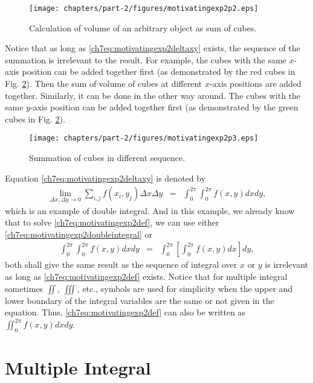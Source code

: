 \begin{figure}
	\centering
	\texttt{[image: chapters/part-2/figures/motivatingexp2p2.eps]}
	\caption{Calculation of volume of an arbitrary object as sum of cubes.} \label{ch7fig:motivatingexp2p2}
\end{figure}

Notice that as long as \eqref{ch7eq:motivatingexp2deltaxy} exists, the sequence of the summation is irrelevant to the result. For example, the cubes with the same $x$-axis position can be added together first (as demonstrated by the red cubes in Fig. \ref{ch7fig:motivatingexp2p3}). Then the sum of volume of cubes at different $x$-axis positions are added together. Similarly, it can be done in the other way around. The cubes with the same $y$-axis position can be added together first (as demonstrated by the green cubes in Fig. \ref{ch7fig:motivatingexp2p3}).

\begin{figure}
	\centering
	\texttt{[image: chapters/part-2/figures/motivatingexp2p3.eps]}
	\caption{Summation of cubes in different sequence.} \label{ch7fig:motivatingexp2p3}
\end{figure}

Equation \eqref{ch7eq:motivatingexp2deltaxy} is denoted by
\begin{eqnarray}
  \lim_{\Delta x, \Delta y \rightarrow 0} \sum_{i,j} f(x_i,y_j) \Delta x \Delta y &=& \int_{0}^{2\pi}\int_{0}^{2\pi} f(x,y) dx dy ,\label{ch7eq:motivatingexp2def}
\end{eqnarray}
which is an example of double integral. And in this example, we already know that to solve \eqref{ch7eq:motivatingexp2def}, we can use either \eqref{ch7eq:motivatingexp2doubleintegral} or
\begin{eqnarray}
  \int_{0}^{2\pi}\int_{0}^{2\pi} f(x,y) dx dy &=& \int_{0}^{2\pi} \left[\int_{0}^{2\pi}f(x,y)dx\right]dy, \nonumber
\end{eqnarray}
both shall give the same result as the sequence of integral over $x$ or $y$ is irrelevant as long as \eqref{ch7eq:motivatingexp2def} exists. Notice that for multiple integral sometimes $\iint$, $\iiint$, etc., symbols are used for simplicity when the upper and lower boundary of the integral variables are the same or not given in the equation. Thus, \eqref{ch7eq:motivatingexp2def} can also be written as $\iint_{0}^{2\pi} f(x,y)dx dy$.

\section{Multiple Integral} \label{ch7sec:multipleintegral}

